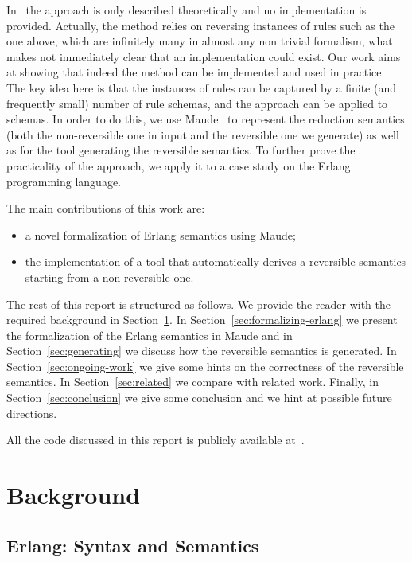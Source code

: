 \documentclass{article}[12pt,a4paper]
\theoremstyle{definition}
\begin{document}
In~\cite{LaneseM20} the approach is only described theoretically and
no implementation is provided. Actually, the method relies on
reversing instances of rules such as the one above, which are infinitely many in almost any
non trivial formalism, what makes not immediately clear that an
implementation could exist. Our work aims at showing that indeed the
method can be implemented and used in practice.  The key idea here is
that the instances of rules can be captured by a finite (and
frequently small) number of rule schemas, and the approach can be
applied to schemas. In order to do this, we use Maude~\cite{maude} to represent the reduction semantics (both the non-reversible one in input and the reversible one we generate) as well as for the tool generating the reversible semantics.
To further prove the practicality of the
approach, we apply it to a case study on the Erlang programming
language.

The main contributions of this work are:
\begin{itemize}
  \item a novel formalization of Erlang semantics using
    Maude;
  \item the implementation of a tool that automatically derives a reversible
    semantics starting from a non reversible one.
\end{itemize}

The rest of this report is structured as follows. We provide the reader with the required
background in Section~\ref{sec:background}. In
Section~\ref{sec:formalizing-erlang} we present the formalization of
the Erlang semantics in Maude and in Section~\ref{sec:generating} we discuss how the reversible semantics
is generated. In Section~\ref{sec:ongoing-work} we give some hints on the correctness of the reversible semantics. In Section~\ref{sec:related} we compare with related work. Finally, in Section~\ref{sec:conclusion} we give some
conclusion and we hint at possible future directions.

All the code discussed in this report is publicly available
at~\cite{erl-maude-repo}. 

\section{Background}\label{sec:background}

\subsection{Erlang: Syntax and Semantics}
\end{document}
